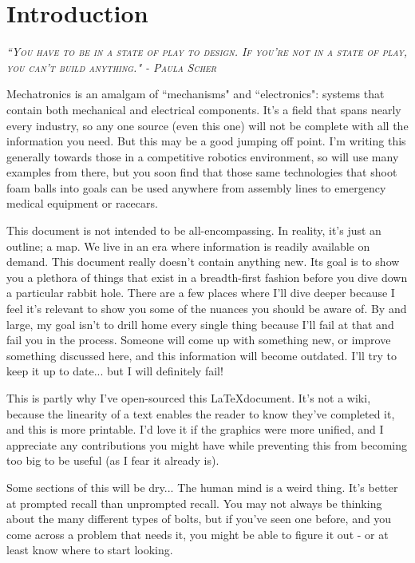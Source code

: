
\chapter{Introduction}
 
 {\slshape \scshape ``You have to be in a state of play to design. If you're not in a state of play, you can't build anything." - Paula Scher}

Mechatronics is an amalgam of ``mechanisms" and ``electronics": systems that contain both mechanical and electrical components. It's a field that spans nearly every industry, so any one source (even this one) will not be complete with all the information you need. But this may be a good jumping off point. I'm writing this generally towards those in a competitive robotics environment, so will use many examples from there, but you soon find that those same technologies that shoot foam balls into goals can be used anywhere from assembly lines to emergency medical equipment or racecars.

This document is not intended to be all-encompassing. In reality, it's just an outline; a map. We live in an era where information is readily available on demand. This document really doesn't contain anything new. Its goal is to show you a plethora of things that exist in a breadth-first fashion before you dive down a particular rabbit hole. There are a few places where I'll dive deeper because I feel it's relevant to show you some of the nuances you should be aware of. By and large, my goal isn't to drill home every single thing because I'll fail at that and fail you in the process. Someone will come up with something new, or improve something discussed here, and this information will become outdated. I'll try to keep it up to date... but I will definitely fail!

This is partly why I've open-sourced this \LaTeX document. It's not a wiki, because the linearity of a text enables the reader to know they've completed it, and this is more printable. I'd love it if the graphics were more unified, and I appreciate any contributions you might have while preventing this from becoming too big to be useful (as I fear it already is).

Some sections of this will be dry... The human mind is a weird thing. It's better at prompted recall than unprompted recall. You may not always be thinking about the many different types of bolts, but if you've seen one before, and you come across a problem that needs it, you might be able to figure it out - or at least know where to start looking.

